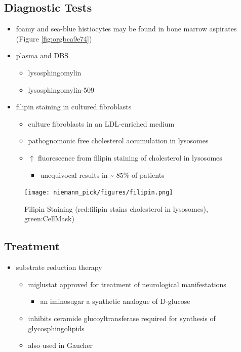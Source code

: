 \documentclass[12pt]{scrartcl}
\begin{document}
\subsection{Diagnostic Tests}
\label{sec:org8ab2e49}
\begin{itemize}
\item foamy and sea-blue histiocytes may be found in bone marrow aspirates
(Figure \ref{fig:orgbca9e74})
\item plasma and DBS
\begin{itemize}
\item lysosphingomylin
\item lysosphingomylin-509
\end{itemize}
\item filipin staining in cultured fibroblasts
\begin{itemize}
\item culture fibroblasts in an LDL-enriched medium
\item pathognomonic free cholesterol accumulation in lysosomes
\item \(\uparrow\) fluorescence from filipin staining of cholesterol in lysosomes 
\begin{itemize}
\item unequivocal results in \textasciitilde{} 85\% of patients
\end{itemize}
\end{itemize}
\end{itemize}


\begin{figure}[htbp]
\centering
\texttt{[image: niemann\_pick/figures/filipin.png]}
\caption{\label{fig:orgf6bb32b}Filipin Staining (red:filipin stains cholesterol in lysosomes), green:CellMask)}
\end{figure}

\subsection{Treatment}
\label{sec:org4c4bec8}
\begin{itemize}
\item substrate reduction therapy
\begin{itemize}
\item miglustat approved for treatment of neurological manifestations
\begin{itemize}
\item an iminosugar a synthetic analogue of D-glucose
\end{itemize}
\item inhibits ceramide glucoyltransferase required for synthesis of
glycosphingolipids
\item also used in Gaucher
\end{itemize}
\end{itemize}
\end{document}
